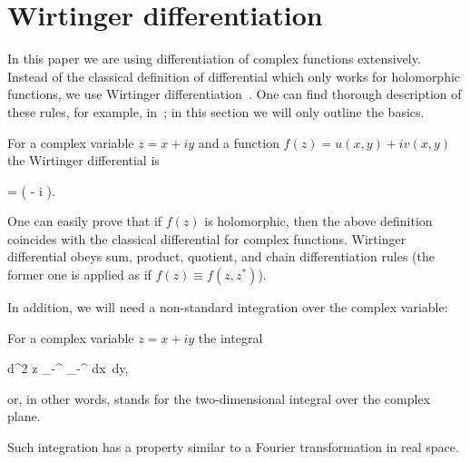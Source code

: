 \section{Wirtinger differentiation}

In this paper we are using differentiation of complex functions extensively.
Instead of the classical definition of differential which only works for holomorphic functions, we use Wirtinger differentiation~\cite{Wirtinger1927}.
One can find thorough description of these rules, for example, in~\cite{Kreutz-Delgado2009}; in this section we will only outline the basics.

\begin{definition}
	For a complex variable $z = x + iy$ and a function $f(z) = u(x, y) + iv(x, y)$ the Wirtinger differential is
	\begin{eqn*}
		=  \left(
			 - i 
		\right).
	\end{eqn*}
\end{definition}

One can easily prove that if $f(z)$ is holomorphic, then the above definition coincides with the classical differential for complex functions.
Wirtinger differential obeys sum, product, quotient, and chain differentiation rules (the former one is applied as if $f(z) \equiv f(z, z^*)$).

In addition, we will need a non-standard integration over the complex variable:

\begin{definition}
	For a complex variable $z = x + iy$ the integral
	\begin{eqn*}
		\int d^2 z \equiv \int_{-\infty}^{\infty} \int_{-\infty}^{\infty} dx\, dy,
	\end{eqn*}
	or, in other words, stands for the two-dimensional integral over the complex plane.
\end{definition}

Such integration has a property similar to a Fourier transformation in real space.

